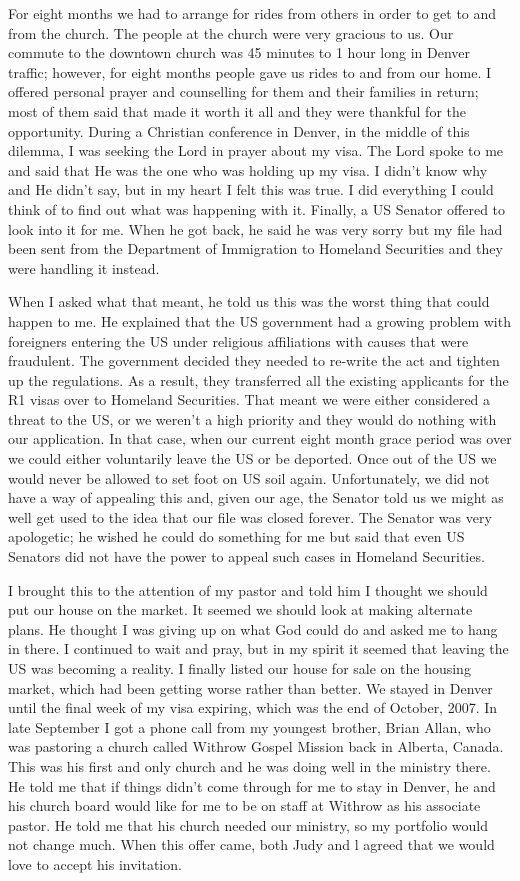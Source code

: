 \documentclass[oneside]{book}
\begin{document}
For eight months we had to arrange for rides from others in order to get to and from the church.  The people at the church were very gracious to us. Our commute to the downtown church was 45 minutes to 1 hour long in Denver traffic; however, for eight months people gave us rides to and from our home. I offered personal prayer and counselling for them and their families in return; most of them said that made it worth it all and they were thankful for the opportunity. During a Christian conference in Denver, in the middle of this dilemma, I was seeking the Lord in prayer about my visa. The Lord spoke to me and said that He was the one who was holding up my visa. I didn't know why and He didn't say, but in my heart I felt this was true. I did everything I could think of to find out what was happening with it. Finally, a US Senator offered to look into it for me. When he got back, he said he was very sorry but my file had been sent from the Department of Immigration to Homeland Securities and they were handling it instead.
 
When I asked what that meant, he told us this was the worst thing that could happen to me. He explained that the US government had a growing problem with foreigners entering the US under religious affiliations with causes that were fraudulent. The government decided they needed to re-write the act and tighten up the regulations. As a result, they transferred all the existing applicants for the R1 visas over to Homeland Securities. That meant we were either considered  a threat to the US, or we weren't a high priority and they would do nothing with our application. In that case, when our current eight month grace period was over we could either voluntarily leave the US or be deported. Once out of the US we would never be allowed to set foot on US soil again. Unfortunately, we did not have a way of appealing this and, given our age, the Senator told us we might as well get used to the idea that our file was closed forever. The Senator was very apologetic; he wished he could do something for me but said that even US Senators did not have the power to appeal such cases in Homeland Securities.

I brought this to the attention of my pastor and told him I thought we should put our house on the market. It seemed we should look at making alternate plans. He thought I was giving up on what God could do and asked me to hang in there. I continued to wait and pray, but in my spirit it seemed that leaving the US was becoming a reality. I finally listed our house for sale on the housing market, which had been getting worse rather than better. We stayed in Denver until the final week of my visa expiring, which was the end of October, 2007. In late September I got a phone call from my youngest brother, Brian Allan, who was pastoring a church called Withrow Gospel Mission back in Alberta, Canada. This was his first and only church and he was doing well in the ministry there. He told me that if things didn't come through for me to stay in Denver, he and his church board would like for me to be on staff at Withrow as his associate pastor. He told me that his church needed our ministry, so my portfolio would not change much. When this offer came, both Judy and l agreed that we would love to accept his invitation.
\end{document}
